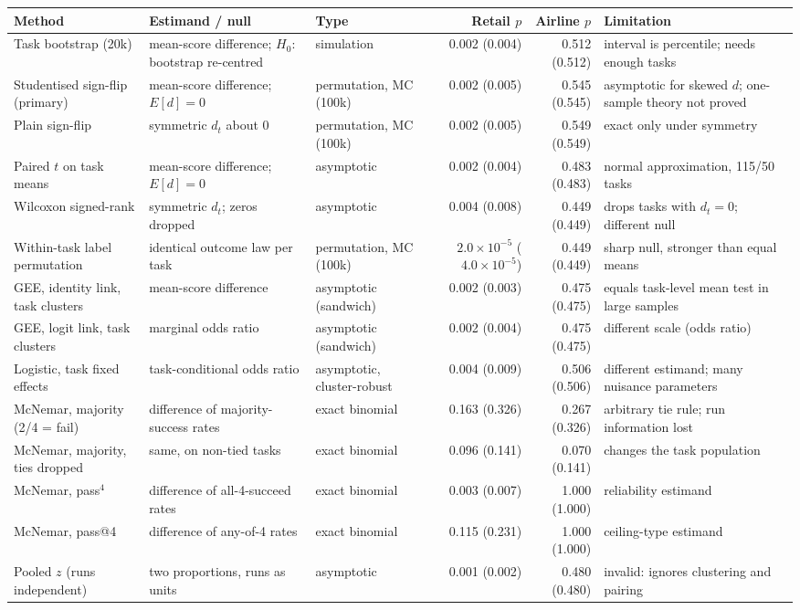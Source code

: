 \begin{tabular}{>{\raggedright\arraybackslash}p{2.35cm}>{\raggedright\arraybackslash}p{3.0cm}>{\raggedright\arraybackslash}p{1.7cm}rr>{\raggedright\arraybackslash}p{2.6cm}}
\toprule
Method & Estimand / null & Type & Retail $p$ & Airline $p$ & Limitation \\
\midrule
Task bootstrap (20k) & mean-score difference; $H_0$: bootstrap re-centred & simulation & 0.002 (0.004) & 0.512 (0.512) & interval is percentile; needs enough tasks \\
Studentised sign-flip (primary) & mean-score difference; $E[d]=0$ & permutation, MC (100k) & 0.002 (0.005) & 0.545 (0.545) & asymptotic for skewed $d$; one-sample theory not proved \\
Plain sign-flip & symmetric $d_t$ about 0 & permutation, MC (100k) & 0.002 (0.005) & 0.549 (0.549) & exact only under symmetry \\
Paired $t$ on task means & mean-score difference; $E[d]=0$ & asymptotic & 0.002 (0.004) & 0.483 (0.483) & normal approximation, 115/50 tasks \\
Wilcoxon signed-rank & symmetric $d_t$; zeros dropped & asymptotic & 0.004 (0.008) & 0.449 (0.449) & drops tasks with $d_t=0$; different null \\
Within-task label permutation & identical outcome law per task & permutation, MC (100k) & $2.0\times10^{-5}$ ($4.0\times10^{-5}$) & 0.449 (0.449) & sharp null, stronger than equal means \\
GEE, identity link, task clusters & mean-score difference & asymptotic (sandwich) & 0.002 (0.003) & 0.475 (0.475) & equals task-level mean test in large samples \\
GEE, logit link, task clusters & marginal odds ratio & asymptotic (sandwich) & 0.002 (0.004) & 0.475 (0.475) & different scale (odds ratio) \\
Logistic, task fixed effects & task-conditional odds ratio & asymptotic, cluster-robust & 0.004 (0.009) & 0.506 (0.506) & different estimand; many nuisance parameters \\
McNemar, majority (2/4 = fail) & difference of majority-success rates & exact binomial & 0.163 (0.326) & 0.267 (0.326) & arbitrary tie rule; run information lost \\
McNemar, majority, ties dropped & same, on non-tied tasks & exact binomial & 0.096 (0.141) & 0.070 (0.141) & changes the task population \\
McNemar, pass$^4$ & difference of all-4-succeed rates & exact binomial & 0.003 (0.007) & 1.000 (1.000) & reliability estimand \\
McNemar, pass@4 & difference of any-of-4 rates & exact binomial & 0.115 (0.231) & 1.000 (1.000) & ceiling-type estimand \\
Pooled $z$ (runs independent) & two proportions, runs as units & asymptotic & 0.001 (0.002) & 0.480 (0.480) & invalid: ignores clustering and pairing \\
\bottomrule
\end{tabular}
